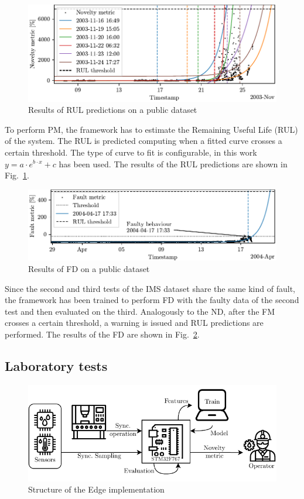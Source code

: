 \begin{figure}
    \includegraphics[width=\linewidth]{images/RUL_IMS.pdf}
    \caption{Results of RUL predictions on a public dataset}
    \label{fig:RUL_IMS}
\end{figure}
To perform PM, the framework has to estimate the Remaining Useful Life (RUL) of the system. The RUL is predicted computing when a fitted curve crosses a certain threshold. The type of curve to fit is configurable, in this work $y = a \cdot e^{b \cdot x} + c$ has been used. The results of the RUL predictions are shown in Fig.~\ref{fig:RUL_IMS}.

\begin{figure}
    \includegraphics[width=\linewidth]{images/FD_IMS.pdf}
    \caption{Results of FD on a public dataset}
    \label{fig:FD_IMS}
\end{figure}
Since the second and third tests of the IMS dataset share the same kind of fault, the framework has been trained to perform FD with the faulty data of the second test and then evaluated on the third. Analogously to the ND, after the FM crosses a certain threshold, a warning is issued and RUL predictions are performed. The results of the FD are shown in Fig.~\ref{fig:FD_IMS}.

\subsection{Laboratory tests}

\begin{figure}
    \includegraphics[width=\linewidth]{images/EmbeddedStructure.pdf}
    \caption{Structure of the Edge implementation}
    \label{fig:embedded}
\end{figure}

